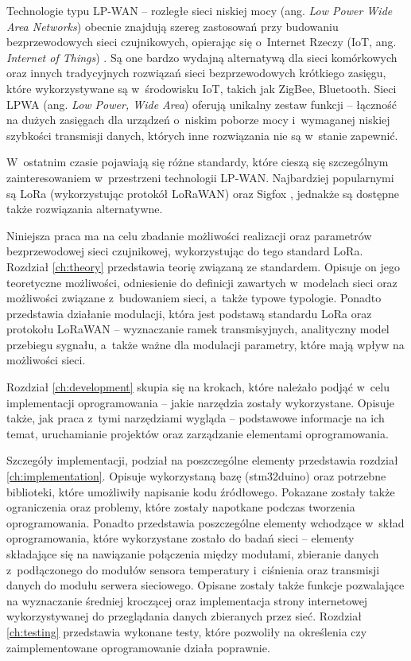 Technologie typu LP-WAN -- rozległe sieci niskiej mocy (ang. \textsl{Low Power Wide Area Networks}) obecnie znajdują
szereg zastosowań przy budowaniu bezprzewodowych sieci czujnikowych, opierając się o~Internet Rzeczy (IoT, ang.
\textsl{Internet of Things}) \cite{lpwan-era}. Są one bardzo wydajną alternatywą dla sieci komórkowych oraz innych
tradycyjnych rozwiązań sieci bezprzewodowych krótkiego zasięgu, które wykorzystywane są w~środowisku IoT, takich jak
ZigBee, Bluetooth. Sieci LPWA (ang. \textsl{Low Power, Wide Area}) oferują unikalny zestaw funkcji -- łączność na dużych
zasięgach dla urządzeń o~niskim poborze mocy i~wymaganej niskiej szybkości transmisji danych, których inne rozwiązania
nie są w~stanie zapewnić.

W~ostatnim czasie pojawiają się różne standardy, które cieszą się szczególnym zainteresowaniem w~przestrzeni technologii
LP-WAN. Najbardziej popularnymi są LoRa (wykorzystując protokół LoRaWAN)\cite{lora-alliance} oraz Sigfox \cite{sigfox},
jednakże są dostępne także rozwiązania alternatywne.

Niniejsza praca ma na celu zbadanie możliwości realizacji oraz parametrów  bezprzewodowej sieci czujnikowej,
wykorzystując do tego standard LoRa. Rozdział \ref{ch:theory} przedstawia teorię związaną ze standardem. Opisuje on jego
teoretyczne możliwości, odniesienie do definicji zawartych w~modelach sieci oraz możliwości związane z~budowaniem sieci,
a~także typowe typologie. Ponadto przedstawia działanie modulacji, która jest podstawą standardu LoRa oraz protokołu
LoRaWAN -- wyznaczanie ramek transmisyjnych, analityczny model przebiegu sygnału, a~także ważne dla modulacji parametry,
które mają wpływ na możliwości sieci.

Rozdział \ref{ch:development} skupia się na krokach, które należało podjąć w~celu implementacji oprogramowania --
jakie narzędzia zostały wykorzystane. Opisuje także, jak praca z~tymi narzędziami wygląda -- podstawowe informacje na
ich temat, uruchamianie projektów oraz zarządzanie elementami oprogramowania.

Szczegóły implementacji, podział na poszczególne elementy przedstawia rozdział \ref{ch:implementation}. Opisuje
wykorzystaną bazę (stm32duino) oraz potrzebne biblioteki, które umożliwiły napisanie kodu źródłowego. Pokazane zostały
także ograniczenia oraz problemy, które zostały napotkane podczas tworzenia oprogramowania. Ponadto przedstawia
poszczególne elementy wchodzące w~skład oprogramowania, które wykorzystane zostało do badań sieci -- elementy składające
się na nawiązanie połączenia między modułami, zbieranie danych z~podłączonego do modułów sensora temperatury i~ciśnienia
oraz transmisji danych do modułu serwera sieciowego. Opisane zostały także funkcje pozwalające na wyznaczanie średniej
kroczącej oraz implementacja strony internetowej wykorzystywanej do przeglądania danych zbieranych przez sieć. Rozdział
\ref{ch:testing} przedstawia wykonane testy, które pozwoliły na określenia czy zaimplementowane oprogramowanie działa
poprawnie.

